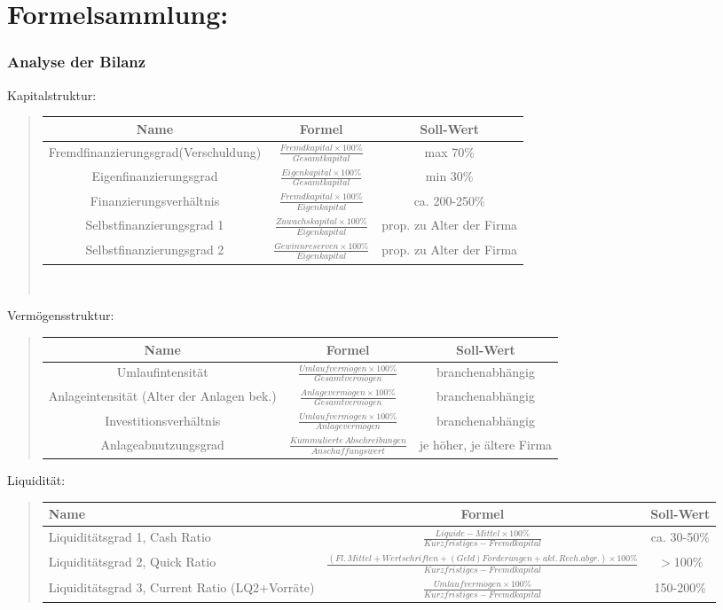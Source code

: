 
\part*{Formelsammlung:}


\section*{Analyse der Bilanz}

Kapitalstruktur:
\begin{verse}
\begin{tabular}{|c|c|c|}
\hline 
Name & Formel  & Soll-Wert\tabularnewline
\hline 
\hline 
Fremdfinanzierungsgrad(Verschuldung) & $\frac{Fremdkapital\times100\%}{Gesamtkapital}$ & max 70\%\tabularnewline
\hline 
Eigenfinanzierungsgrad & $\frac{Eigenkapital\times100\%}{Gesamtkapital}$ & min 30\%\tabularnewline
\hline 
Finanzierungsverhältnis & $\frac{Fremdkapital\times100\%}{Eigenkapital}$ & ca. 200-250\%\tabularnewline
\hline 
Selbstfinanzierungsgrad 1 & $\frac{Zuwachskapital\times100\%}{Eigenkapital}$ & prop. zu Alter der Firma\tabularnewline
\hline 
Selbstfinanzierungsgrad 2  & $\frac{Gewinnreserven\times100\%}{Eigenkapital}$ & prop. zu Alter der Firma\tabularnewline
\hline 
\end{tabular}$\frac{}{}$
\end{verse}
Vermögensstruktur:
\begin{verse}
\begin{tabular}{|c|c|c|}
\hline 
Name & Formel  & Soll-Wert\tabularnewline
\hline 
\hline 
Umlaufintensität & $\frac{Umlaufverm\ddot{o}gen\times100\%}{Gesamtverm\ddot{o}gen}$ & branchenabhängig\tabularnewline
\hline 
Anlageintensität (Alter der Anlagen bek.) & $\frac{Anlageverm\ddot{o}gen\times100\%}{Gesamtverm\ddot{o}gen}$ & branchenabhängig\tabularnewline
\hline 
Investitionsverhältnis & $\frac{Umlaufverm\ddot{o}gen\times100\%}{Anlageverm\ddot{o}gen}$ & branchenabhängig\tabularnewline
\hline 
Anlageabnutzungsgrad & $\frac{Kummulierte\, Abschreibungen}{Anschaffungswert}$ & je höher, je ältere Firma\tabularnewline
\hline 
\end{tabular}
\end{verse}
Liquidität:
\begin{verse}
\begin{tabular}{|>{\centering}p{5cm}|c|c|}
\hline 
Name & Formel  & Soll-Wert\tabularnewline
\hline 
\hline 
Liquiditätsgrad 1, Cash Ratio & $\frac{Liquide-Mittel\times100\%}{Kurzfristiges-Fremdkapital}$ & ca. 30-50\%\tabularnewline
\hline 
Liquiditätsgrad 2, Quick Ratio & $\frac{(Fl.\, Mittel+Wertschriften+(Geld)Forderungen+akt.\, Rech.abgr.)\times100\%}{Kurzfristiges-Fremdkapital}$ & $>$100\%\tabularnewline
\hline 
Liquiditätsgrad 3, Current Ratio (LQ2+Vorräte) & $\frac{Umlaufverm\ddot{o}gen\times100\%}{Kurzfristiges-Fremdkapital}$ & 150-200\%\tabularnewline
\hline 
\end{tabular}
\end{verse}
